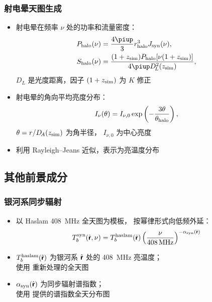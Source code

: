 \documentclass{beamer}
\begin{document}
\begin{frame}[subsec]
  \frametitle{射电晕天图生成}
  \begin{itemize}
    \item 射电晕在频率 $\nu$ 处的功率和流量密度：
      \begin{align}
        P_{\R{halo}}(\nu)
          & = \frac{4\Cpi}{3} r^3_{\R{halo}} J_{\R{syn}}(\nu) , \\
        S_{\R{halo}}(\nu)
          & = \frac{(1+z_{\R{sim}}) P_{\R{halo}}[\nu (1+z_{\R{sim}})]}{
            4\Cpi D^2_{\!L}(z_{\R{sim}})} ,
      \end{align}
      $D_{\!L}$ 是光度距离，因子 $(1+z_{\text{sim}})$ 为 $K$ 修正
    \item 射电晕的角向平均亮度分布：
      \begin{equation}
        I_{\nu}(\theta) = I_{\nu,0} \exp
          \left( -\frac{3\theta}{\theta_{\text{halo}}} \right) ,
      \end{equation}
      $\theta = r / D_{\!A}(z_{\text{sim}})$ 为角半径，
      $I_{\nu,0}$ 为中心亮度
    \item 利用 Rayleigh--Jeans 近似，表示为亮温度分布
  \end{itemize}
\end{frame}

\subsection{其他前景成分}

\begin{frame}[subsec]
  \frametitle{银河系同步辐射}
  \begin{itemize}
    \item 以 Haslam \SI{408}{\MHz} 全天图为模板，
      按幂律形式向低频外延：
      \begin{equation}
        T_b^{\R{syn}}(\hat{\B{r}}, \nu)
          = T_b^{\R{haslam}}(\hat{\B{r}})
            \left( \frac{\nu}{\SI{408}{\MHz}}
            \right)^{-\alpha_{\R{syn}}(\hat{\B{r}})}
      \end{equation}
    \item $T_b^{\text{haslam}}(\hat{\bm{\mathsf{r}}})$
      为银河系 $\hat{\bm{\mathsf{r}}}$ 处的 \SI{408}{\MHz} 亮温度；\\
      使用 \cite{remazeilles2015} 重新处理的全天图
    \item $\alpha_{\text{syn}}(\hat{\bm{\mathsf{r}}})$ 为同步辐射谱指数；\\
      使用 \cite{giardino2002} 提供的谱指数全天分布图
  \end{itemize}
\end{frame}
\end{document}
